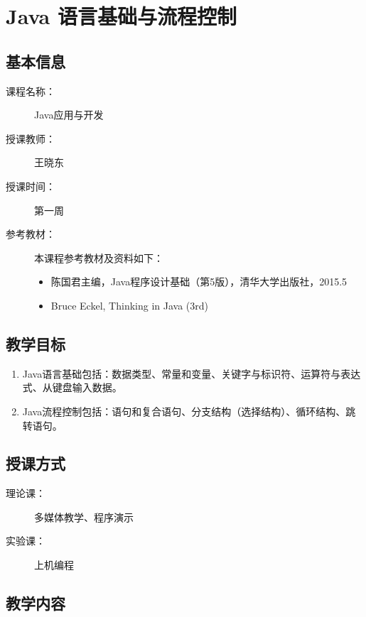 \chapter{Java 语言基础与流程控制}
\label{chp:Java-language-basic-and-flow-control}

\section*{基本信息}
\sline
\begin{description}
\item[课程名称：] Java应用与开发
\item[授课教师：] 王晓东
\item[授课时间：] 第一周
\item[参考教材：] 本课程参考教材及资料如下：
  \begin{itemize}
  \item 陈国君主编，Java程序设计基础（第5版），清华大学出版社，2015.5
  \item Bruce Eckel, Thinking in Java (3rd)
  \end{itemize}
\end{description}

\section*{教学目标}

\sline

\begin{enumerate}
\item Java语言基础包括：数据类型、常量和变量、关键字与标识符、运算符与表达式、从键盘输入数据。
\item Java流程控制包括：语句和复合语句、分支结构（选择结构）、循环结构、跳转语句。
\end{enumerate}

\section*{授课方式}

\sline
\begin{description}
\item[理论课：] 多媒体教学、程序演示
\item[实验课：] 上机编程
\end{description}

\newpage
\section*{教学内容}
\sline

